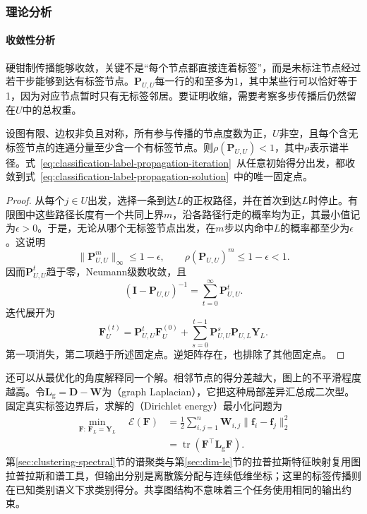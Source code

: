 \subsubsection{理论分析}
\label{sec:classification-label-propagation-analysis}

\paragraph{收敛性分析}
硬钳制传播能够收敛，关键不是“每个节点都直接连着标签”，而是未标注节点经过若干步能够到达有标签节点。$\bm{P}_{U,U}$每一行的和至多为1，其中某些行可以恰好等于1，因为对应节点暂时只有无标签邻居。要证明收缩，需要考察多步传播后仍然留在$U$中的总权重。

\begin{theorem}[硬钳制传播的唯一解]
  \label{thm:classification-label-propagation-convergence}
  设图有限、边权非负且对称，所有参与传播的节点度数为正，$U$非空，且每个含无标签节点的连通分量至少含一个有标签节点。则$\rho(\bm{P}_{U,U})<1$，其中$\rho$表示谱半径。式~\eqref{eq:classification-label-propagation-iteration}~从任意初始得分出发，都收敛到式~\eqref{eq:classification-label-propagation-solution}~中的唯一固定点。
\end{theorem}

\begin{proof}
  从每个$j\in U$出发，选择一条到达$L$的正权路径，并在首次到达$L$时停止。有限图中这些路径长度有一个共同上界$m$，沿各路径行走的概率均为正，其最小值记为$\epsilon>0$。于是，无论从哪个无标签节点出发，在$m$步以内命中$L$的概率都至少为$\epsilon$。这说明
  \[
    \lVert\bm{P}_{U,U}^{m}\rVert_\infty\leq1-\epsilon,
    \qquad
    \rho(\bm{P}_{U,U})^m\leq1-\epsilon<1.
  \]
  因而$\bm{P}_{U,U}^t$趋于零，Neumann级数收敛，且
  \[
    (\bm{I}-\bm{P}_{U,U})^{-1}
      =\sum_{t=0}^{\infty}\bm{P}_{U,U}^{t}.
  \]
  迭代展开为
  \[
    \bm{F}_U^{(t)}
      =\bm{P}_{U,U}^{t}\bm{F}_U^{(0)}
       +\sum_{s=0}^{t-1}
         \bm{P}_{U,U}^{s}\bm{P}_{U,L}\bm{Y}_L.
  \]
  第一项消失，第二项趋于所述固定点。逆矩阵存在，也排除了其他固定点。
\end{proof}

还可以从最优化的角度解释同一个解。相邻节点的得分差越大，图上的不平滑程度越高。令$\bm{L}_{\mathrm{g}}=\bm{D}-\bm{W}$为（graph Laplacian），它把这种局部差异汇总成二次型。固定真实标签边界后，求解的（Dirichlet energy）最小化问题为
\begin{equation}
  \label{eq:classification-label-propagation-energy}
  \begin{aligned}
    \min_{\bm{F}:\,\bm{F}_L=\bm{Y}_L}\quad
    \mathcal{E}(\bm{F})
      &=\frac12\sum_{i,j=1}^{n}
        \bm{W}_{i,j}\lVert\bm{f}_i-\bm{f}_j\rVert_2^2\\
      &=\operatorname{tr}
        (\bm{F}^{\top}\bm{L}_{\mathrm{g}}\bm{F}).
  \end{aligned}
\end{equation}
第\ref{sec:clustering-spectral}节的谱聚类与第\ref{sec:dim-le}节的拉普拉斯特征映射复用图拉普拉斯和谱工具，但输出分别是离散簇分配与连续低维坐标；这里的标签传播则在已知类别语义下求类别得分。共享图结构不意味着三个任务使用相同的输出约束。

